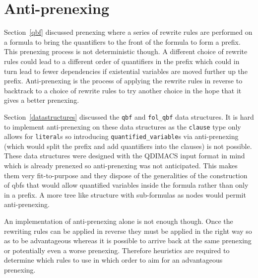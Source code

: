 \section{Anti-prenexing}
Section~\ref{qbf} discussed prenexing where a series of rewrite rules are performed on a formula to bring the quantifiers to the front of the formula to form a prefix. This prenexing process is not deterministic though. A different choice of rewrite rules could lead to a different order of quantifiers in the prefix which could in turn lead to fewer dependencies if existential variables are moved further up the prefix. Anti-prenexing is the process of applying the rewrite rules in reverse to backtrack to a choice of rewrite rules to try another choice in the hope that it gives a better prenexing.

Section~\ref{datastructures} discussed the \texttt{qbf} and \texttt{fol\_qbf} data structures. It is hard to implement anti-prenexing on these data structures as the \texttt{clause} type only allows for \texttt{literal}s so introducing \texttt{quantified\_variable}s via anti-prenexing (which would split the prefix and add quantifiers into the clauses) is not possible. These data structures were designed with the QDIMACS input format in mind which is already prenexed so anti-prenexing was not anticipated. This makes them very fit-to-purpose and they dispose of the generalities of the construction of \glspl{qbf} that would allow quantified variables inside the formula rather than only in a prefix. A more tree like structure with sub-formulas as nodes would permit anti-prenexing.

An implementation of anti-prenexing alone is not enough though. Once the rewriting rules can be applied in reverse they must be applied in the right way so as to be advantageous whereas it is possible to arrive back at the same prenexing or potentially even a worse prenexing. Therefore heuristics are required to determine which rules to use in which order to aim for an advantageous prenexing.
